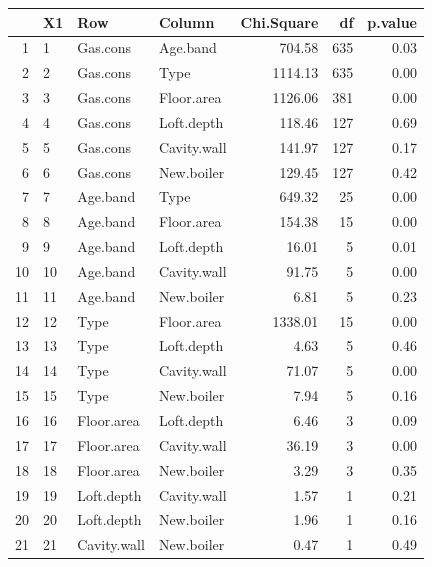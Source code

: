 \documentclass[11pt]{article}
\begin{document}
\begin{table}[ht]
	\centering
	\begin{tabular}{rlllrrr}
		\hline
		& X1 & Row & Column & Chi.Square & df & p.value \\ 
		\hline
		1 & 1 & Gas.cons & Age.band & 704.58 & 635 & 0.03 \\ 
		2 & 2 & Gas.cons & Type & 1114.13 & 635 & 0.00 \\ 
		3 & 3 & Gas.cons & Floor.area & 1126.06 & 381 & 0.00 \\ 
		4 & 4 & Gas.cons & Loft.depth & 118.46 & 127 & 0.69 \\ 
		5 & 5 & Gas.cons & Cavity.wall & 141.97 & 127 & 0.17 \\ 
		6 & 6 & Gas.cons & New.boiler & 129.45 & 127 & 0.42 \\ 
		7 & 7 & Age.band & Type & 649.32 &  25 & 0.00 \\ 
		8 & 8 & Age.band & Floor.area & 154.38 &  15 & 0.00 \\ 
		9 & 9 & Age.band & Loft.depth & 16.01 &   5 & 0.01 \\ 
		10 & 10 & Age.band & Cavity.wall & 91.75 &   5 & 0.00 \\ 
		11 & 11 & Age.band & New.boiler & 6.81 &   5 & 0.23 \\ 
		12 & 12 & Type & Floor.area & 1338.01 &  15 & 0.00 \\ 
		13 & 13 & Type & Loft.depth & 4.63 &   5 & 0.46 \\ 
		14 & 14 & Type & Cavity.wall & 71.07 &   5 & 0.00 \\ 
		15 & 15 & Type & New.boiler & 7.94 &   5 & 0.16 \\ 
		16 & 16 & Floor.area & Loft.depth & 6.46 &   3 & 0.09 \\ 
		17 & 17 & Floor.area & Cavity.wall & 36.19 &   3 & 0.00 \\ 
		18 & 18 & Floor.area & New.boiler & 3.29 &   3 & 0.35 \\ 
		19 & 19 & Loft.depth & Cavity.wall & 1.57 &   1 & 0.21 \\ 
		20 & 20 & Loft.depth & New.boiler & 1.96 &   1 & 0.16 \\ 
		21 & 21 & Cavity.wall & New.boiler & 0.47 &   1 & 0.49 \\ 
		\hline
	\end{tabular}
\end{table}
\end{document}
